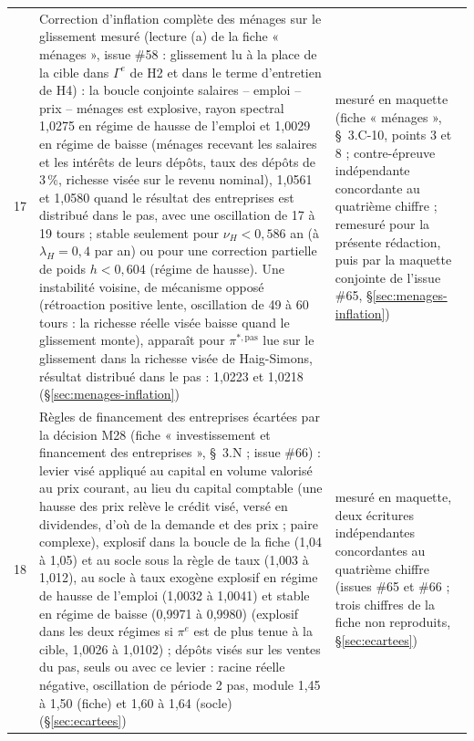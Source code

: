 \documentclass[11pt,a4paper]{article}
\begin{document}
\begin{center}
\begin{longtable}{p{0.5cm}p{11.2cm}>{\raggedright\arraybackslash}p{3.0cm}}
17 & Correction d'inflation complète des ménages sur le glissement mesuré (lecture (a) de la fiche « ménages », issue \#58 : glissement lu à la place de la cible dans $\Gamma^e$ de H2 et dans le terme d'entretien de H4) : la boucle conjointe salaires -- emploi -- prix -- ménages est explosive, rayon spectral 1,0275 en régime de hausse de l'emploi et 1,0029 en régime de baisse (ménages recevant les salaires et les intérêts de leurs dépôts, taux des dépôts de 3\,\%, richesse visée sur le revenu nominal), 1,0561 et 1,0580 quand le résultat des entreprises est distribué dans le pas, avec une oscillation de 17 à 19 tours ; stable seulement pour $\nu_H < 0{,}586$ an (à $\lambda_H = 0{,}4$ par an) ou pour une correction partielle de poids $h < 0{,}604$ (régime de hausse). Une instabilité voisine, de mécanisme opposé (rétroaction positive lente, oscillation de 49 à 60 tours : la richesse réelle visée baisse quand le glissement monte), apparaît pour $\pi^{\ast,\mathrm{pas}}$ lue sur le glissement dans la richesse visée de Haig-Simons, résultat distribué dans le pas : 1,0223 et 1,0218 (\S\ref{sec:menages-inflation}) & mesuré en maquette (fiche « ménages », \S~3.C-10, points 3 et 8 ; contre-épreuve indépendante concordante au quatrième chiffre ; remesuré pour la présente rédaction, puis par la maquette conjointe de l'issue \#65, \S\ref{sec:menages-inflation})\\
18 & Règles de financement des entreprises écartées par la décision M28 (fiche « investissement et financement des entreprises », \S~3.N ; issue \#66) : levier visé appliqué au capital en volume valorisé au prix courant, au lieu du capital comptable (une hausse des prix relève le crédit visé, versé en dividendes, d'où de la demande et des prix ; paire complexe), explosif dans la boucle de la fiche (1,04 à 1,05) et au socle sous la règle de taux (1,003 à 1,012), au socle à taux exogène explosif en régime de hausse de l'emploi (1,0032 à 1,0041) et stable en régime de baisse (0,9971 à 0,9980) (explosif dans les deux régimes si $\pi^e$ est de plus tenue à la cible, 1,0026 à 1,0102) ; dépôts visés sur les ventes du pas, seuls ou avec ce levier : racine réelle négative, oscillation de période 2 pas, module 1,45 à 1,50 (fiche) et 1,60 à 1,64 (socle) (\S\ref{sec:ecartees}) & mesuré en maquette, deux écritures indépendantes concordantes au quatrième chiffre (issues \#65 et \#66 ; trois chiffres de la fiche non reproduits, \S\ref{sec:ecartees})\\
\bottomrule
\end{longtable}
\end{center}
\end{document}
